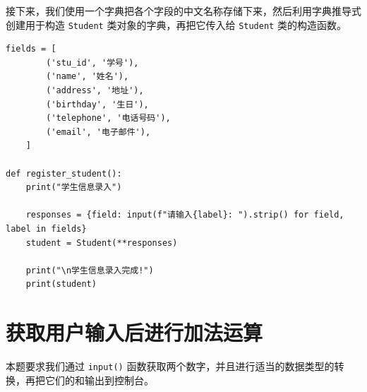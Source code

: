 \documentclass[openany, 10pt]{ctexart}
\begin{document}
接下来，我们使用一个字典把各个字段的中文名称存储下来，然后利用字典推导式创建用于构造 \lstinline|Student| 类对象的字典，再把它传入给 \lstinline|Student| 类的构造函数。
\begin{lstlisting}
fields = [
        ('stu_id', '学号'),
        ('name', '姓名'),
        ('address', '地址'),
        ('birthday', '生日'),
        ('telephone', '电话号码'),
        ('email', '电子邮件'),
    ]

def register_student():
    print("学生信息录入")

    responses = {field: input(f"请输入{label}: ").strip() for field, label in fields}
    student = Student(**responses)

    print("\n学生信息录入完成!")
    print(student)
\end{lstlisting}
    
\section{获取用户输入后进行加法运算}
    
本题要求我们通过 \lstinline|input()| 函数获取两个数字，并且进行适当的数据类型的转换，再把它们的和输出到控制台。

\end{document}
